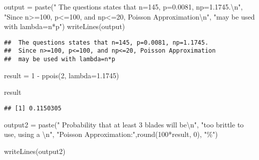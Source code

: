 \documentclass[
]{article}
\newenvironment{Shaded}{\begin{snugshade}}{\end{snugshade}}
\newcommand{\AttributeTok}[1]{\textcolor[rgb]{0.77,0.63,0.00}{#1}}
\newcommand{\DecValTok}[1]{\textcolor[rgb]{0.00,0.00,0.81}{#1}}
\newcommand{\FloatTok}[1]{\textcolor[rgb]{0.00,0.00,0.81}{#1}}
\newcommand{\FunctionTok}[1]{\textcolor[rgb]{0.00,0.00,0.00}{#1}}
\newcommand{\NormalTok}[1]{#1}
\newcommand{\OtherTok}[1]{\textcolor[rgb]{0.56,0.35,0.01}{#1}}
\newcommand{\SpecialCharTok}[1]{\textcolor[rgb]{0.00,0.00,0.00}{#1}}
\newcommand{\StringTok}[1]{\textcolor[rgb]{0.31,0.60,0.02}{#1}}
\begin{document}
\begin{Shaded}
\begin{Highlighting}[]
\NormalTok{output }\OtherTok{=} \FunctionTok{paste}\NormalTok{(}\StringTok{" The questions states that n=145, p=0.0081, np=1.1745.}\SpecialCharTok{\textbackslash{}n}\StringTok{"}\NormalTok{, }
               \StringTok{"Since n\textgreater{}=100, p\textless{}=100, and np\textless{}=20, Poisson Approximation}\SpecialCharTok{\textbackslash{}n}\StringTok{"}\NormalTok{, }
               \StringTok{"may be used with lambda=n*p"}\NormalTok{)}
\FunctionTok{writeLines}\NormalTok{(output)}
\end{Highlighting}
\end{Shaded}

\begin{verbatim}
##  The questions states that n=145, p=0.0081, np=1.1745.
##  Since n>=100, p<=100, and np<=20, Poisson Approximation
##  may be used with lambda=n*p
\end{verbatim}

\begin{Shaded}
\begin{Highlighting}[]
\NormalTok{result }\OtherTok{=} \DecValTok{1} \SpecialCharTok{{-}} \FunctionTok{ppois}\NormalTok{(}\DecValTok{2}\NormalTok{, }\AttributeTok{lambda=}\FloatTok{1.1745}\NormalTok{)}

\NormalTok{result}
\end{Highlighting}
\end{Shaded}

\begin{verbatim}
## [1] 0.1150305
\end{verbatim}

\begin{Shaded}
\begin{Highlighting}[]
\NormalTok{output2 }\OtherTok{=} \FunctionTok{paste}\NormalTok{(}\StringTok{" Probability that at least 3 blades will be}\SpecialCharTok{\textbackslash{}n}\StringTok{"}\NormalTok{, }
                \StringTok{"too brittle to use, using a }\SpecialCharTok{\textbackslash{}n}\StringTok{"}\NormalTok{, }
                \StringTok{"Poisson Approximation:"}\NormalTok{,}\FunctionTok{round}\NormalTok{(}\DecValTok{100}\SpecialCharTok{*}\NormalTok{result, }\DecValTok{0}\NormalTok{), }\StringTok{"\%"}\NormalTok{)}

\FunctionTok{writeLines}\NormalTok{(output2)}
\end{Highlighting}
\end{Shaded}
\end{document}
